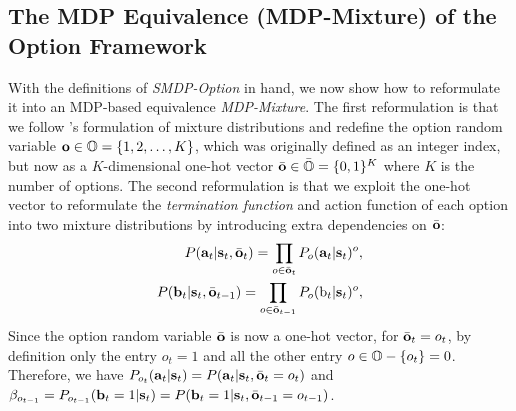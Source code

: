 \documentclass[10pt,journal,compsoc]{IEEEtran}
\renewcommand{\citename}{\citet}
\renewcommand{\cite}{\citep}
\begin{document}


\subsection{The MDP Equivalence (MDP-Mixture) of the Option
  Framework}
\label{sec:mdp_option}
With the definitions of \emph{SMDP-Option} in hand, we now show
how to reformulate it into an MDP-based equivalence
\emph{MDP-Mixture}. The first reformulation is that we follow
\citename{bishop2006pattern}'s formulation of mixture
distributions and redefine the option random variable
${\mathbf{o}}\in{\mathbb{O}}=\{1,2,\dots,K\}$, which was originally defined as an
integer index, but now as a $K$-dimensional one-hot vector
$\bar{{\mathbf{o}}}\in\bar{{\mathbb{O}}}=\{0,1\}^K$ where $K$ is the number of
options. The second reformulation is that we exploit the one-hot
vector to reformulate the \emph{termination function} and action
function of each option into two mixture distributions by
introducing extra dependencies on $\bar{{\mathbf{o}}}$:
\begin{align}
  \label{eq:mdp_action_termination}
P(\rva_t|\rvs_t,\bar{\rvo}_t) =
\prod_{o\in\bar{\rvo}_t}P_{o}(\rva_t|\rvs_t)^{o},\nonumber\\
P(\rvb_t|\rvs_t,\bar{\rvo}_{t-1}) =
\prod_{o\in\bar{\rvo}_{t-1}}P_{o}(\rb_t|\rvs_t)^{o},
\end{align}
Since the option random variable $\bar{{\mathbf{o}}}$ is now a one-hot
vector, for $\bar{{\mathbf{o}}}_t=o_t$, by definition only the entry
$o_t=1$ and all the other entry $o\in{\mathbb{O}}-\{o_t\}=0$. Therefore,
we have
$P_{o_t}({\mathbf{a}}_t|{\mathbf{s}}_t)=P({\mathbf{a}}_t|{\mathbf{s}}_t,\bar{{\mathbf{o}}}_t=o_t)$ and
$\beta_{o_{t-1}}=P_{o_{t-1}}({\mathbf{b}}_t=1|{\mathbf{s}}_t)=P({\mathbf{b}}_t=1|{\mathbf{s}}_t,\bar{{\mathbf{o}}}_{t-1}=o_{t-1})$.
\end{document}
